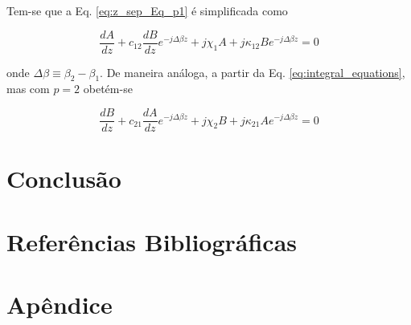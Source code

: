 \documentclass[final,12pt,times,twocolumn,authoryear]{elsarticle}
\begin{document}
Tem-se que a Eq. \ref{eq:z_sep_Eq_p1} é simplificada como

\begin{equation}
\frac{dA}{dz} + c_{12}\frac{dB}{dz}e^{-j\Delta\beta z} + j\chi_1A + j\kappa_{12}Be^{-j\Delta\beta z} = 0
\end{equation}

onde $\Delta\beta\equiv\beta_2-\beta_1$. De maneira análoga, a partir da Eq. \ref{eq:integral_equations}, mas com $p=2$ obetém-se

\begin{equation}
\frac{dB}{dz} + c_{21}\frac{dA}{dz}e^{-j\Delta\beta z} + j\chi_2B + j\kappa_{21}Ae^{-j\Delta\beta z} = 0
\end{equation} 

\section{Conclusão}
\label{sec:conclusion}

\section*{Referências Bibliográficas}

\section*{Apêndice}
\label{sec:appendix}
\end{document}
